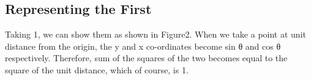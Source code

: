 \documentclass{article}
\begin{document}
\subsection{Representing the First}

Taking 1, we can show them as shown in Figure2. When we take a point at
unit distance from the origin, the y and x co-ordinates become sin θ and cos θ
respectively. Therefore, sum of the squares of the two becomes equal to the
square of the unit distance, which of course, is 1.
    
    
\end{document}
